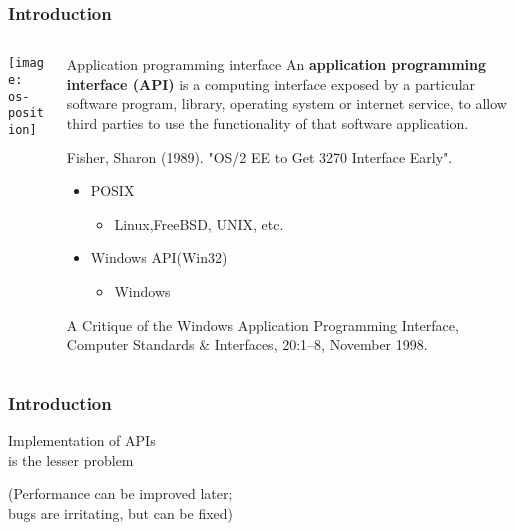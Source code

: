 \begin{frame}[plain]
	\frametitle{Introduction}
	
	
	
	\begin{columns}
		
		\begin{column}{.4\textwidth}
			
			\texttt{[image: os-position]}
			
		\end{column}
		
		\begin{column}{.6\textwidth}
			
			\begin{block}{Application programming interface}
				An \textbf{application programming interface (API) }is a computing interface exposed by a particular software program, library, operating system or internet service, to allow third parties to use the functionality of that software application.
			\end{block} 
			\tiny Fisher, Sharon (1989). "OS/2 EE to Get 3270 Interface Early". 
			
			\normalsize
			\begin{itemize}
				\item POSIX
				\begin{itemize}
					\item Linux,FreeBSD, UNIX, etc.
					
				\end{itemize}
			
				\item Windows API(Win32)
				\begin{itemize}
					\item Windows
				
				\end{itemize}
			\end{itemize}
			\tiny A Critique of the Windows	Application Programming Interface, Computer Standards \& Interfaces, 20:1–8, November 1998.
		\end{column}
		
		
	\end{columns}

	
	
	
\end{frame}


\begin{frame}[plain]
	\frametitle{Introduction}
	
	\begin{center}
	\Huge 
	Implementation of APIs \\
	is the lesser problem
	
	
	\normalsize
	(Performance can be improved later; \\
	bugs are irritating, but can be fixed)
	
	\end{center}

	
\end{frame}


